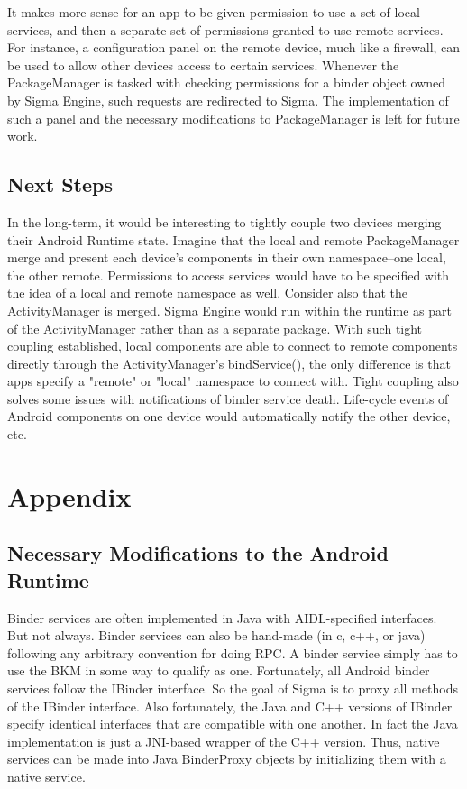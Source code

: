 \documentclass[prodmode]{acmlarge}
\begin{document}
It makes more sense for an app to be given permission to use a set of local services, and then a separate set of permissions granted to use remote services. For instance, a configuration panel on the remote device, much like a firewall, can be used to allow other devices access to certain services. Whenever the PackageManager is tasked with checking permissions for a binder object owned by Sigma Engine, such requests are redirected to Sigma. The implementation of such a panel and the necessary modifications to PackageManager is left for future work.

\subsection{Next Steps}
\label{sec:NextSteps}
In the long-term, it would be interesting to tightly couple two devices merging their Android Runtime state. Imagine that the local and remote PackageManager merge and present each device's components in their own namespace--one local, the other remote. Permissions to access services would have to be specified with the idea of a local and remote namespace as well. Consider also that the ActivityManager is merged. Sigma Engine would run within the runtime as part of the ActivityManager rather than as a separate package. With such tight coupling established, local components are able to connect to remote components directly through the ActivityManager's bindService(), the only difference is that apps specify a "remote" or "local" namespace to connect with. Tight coupling also solves some issues with notifications of binder service death. Life-cycle events of Android components on one device would automatically notify the other device, etc.

\pagebreak[4]
\section{Appendix}

\subsection{Necessary Modifications to the Android Runtime}
\label{sec:AndroidRuntimeModifications}
Binder services are often implemented in Java with AIDL-specified interfaces. But not always. Binder services can also be hand-made (in c, c++, or java) following any arbitrary convention for doing RPC. A binder service simply has to use the BKM in some way to qualify as one. Fortunately, all Android binder services follow the IBinder interface. So the goal of Sigma is to proxy all methods of the IBinder interface. Also fortunately, the Java and C++ versions of IBinder specify identical interfaces that are compatible with one another. In fact the Java implementation is just a JNI-based wrapper of the C++ version. Thus, native services can be made into Java BinderProxy objects by initializing them with a native service.
\end{document}

